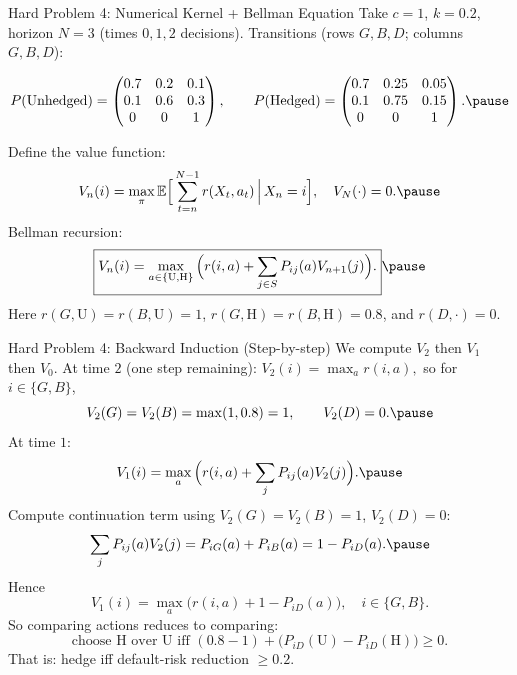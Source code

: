 \documentclass[aspectratio=169]{beamer}
\begin{document}
\begin{frame}{Hard Problem 4: Numerical Kernel + Bellman Equation}
Take $c=1$, $k=0.2$, horizon $N=3$ (times $0,1,2$ decisions).\pause
Transitions (rows $G,B,D$; columns $G,B,D$):

\[
P(\text{Unhedged})=
\begin{pmatrix}
0.7&0.2&0.1\\
0.1&0.6&0.3\\
0&0&1
\end{pmatrix},
\qquad
P(\text{Hedged})=
\begin{pmatrix}
0.7&0.25&0.05\\
0.1&0.75&0.15\\
0&0&1
\end{pmatrix}.\pause
\]

Define the value function:
\[
V_n(i)=\max_{\pi}\mathbb{E}\Big[\sum_{t=n}^{N-1} r(X_t,a_t)\,\Big|\,X_n=i\Big],
\quad V_N(\cdot)=0.
\vspace{-2mm}\pause
\]
Bellman recursion:
\vspace{-3mm}
\[
\boxed{
V_n(i)=\max_{a\in\{\mathrm{U},\mathrm{H}\}}
\Big(
r(i,a)+\sum_{j\in S} P_{ij}(a)V_{n+1}(j)
\Big).}\pause
\]
Here $r(G,\mathrm{U})=r(B,\mathrm{U})=1$, $r(G,\mathrm{H})=r(B,\mathrm{H})=0.8$, and $r(D,\cdot)=0$.
\end{frame}

\begin{frame}{Hard Problem 4: Backward Induction (Step-by-step)}
We compute $V_2$ then $V_1$ then $V_0$.\pause
At time $2$ (one step remaining):
$
V_2(i)=\max_{a} r(i,a),
$
so for $i\in\{G,B\}$,
\vspace{-2mm}
\[
V_2(G)=V_2(B)=\max(1,0.8)=1,
\qquad V_2(D)=0.
\vspace{-3mm}\pause
\]
At time $1$:
\vspace{-3mm}
\[
V_1(i)=\max_a\Big(r(i,a)+\sum_j P_{ij}(a)V_2(j)\Big).
\vspace{-2mm}\pause
\]
Compute continuation term using $V_2(G)=V_2(B)=1$, $V_2(D)=0$:
\[
\sum_j P_{ij}(a)V_2(j)=P_{iG}(a)+P_{iB}(a)=1-P_{iD}(a).
\vspace{-3mm}\pause
\]
Hence
\[
V_1(i)=\max_a\Big(r(i,a)+1-P_{iD}(a)\Big),\quad i\in\{G,B\}.
\]
So comparing actions reduces to comparing:
\[
\text{choose H over U iff } (0.8-1) + \big(P_{iD}(\mathrm{U})-P_{iD}(\mathrm{H})\big)\ge 0.
\]
That is: hedge iff default-risk reduction $\ge 0.2$.
\end{frame}
\end{document}
